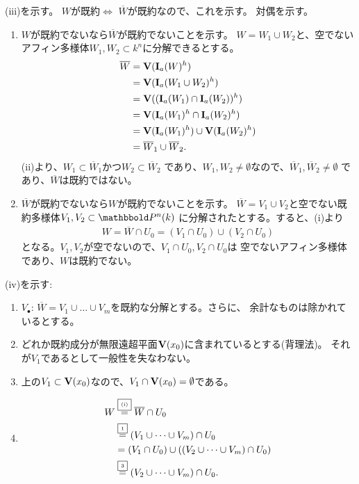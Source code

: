 \begin{myproof}
  (iii)を示す。
  $W$が既約$\iff $ $\overline W$が既約なので、これを示す。
  対偶を示す。
  \begin{enumerate}
    \item $W$が既約でないなら$\overline W$が既約でないことを示す。
    $W=W_1 \cup W_2$と、空でないアフィン多様体$W_1,W_2 \subset k^n$に分解できるとする。
    \begin{align}
      \overline W
      &=
      \textbf V(\textbf I_a(W)^h)\\
      &=
      \textbf V(\textbf I_a(W_1 \cup W_2)^h)\\
      &=
      \textbf V((\textbf I_a(W_1) \cap \textbf I_a(W_2))^h)\\
      &=
      \textbf V(\textbf I_a(W_1)^h \cap \textbf I_a(W_2)^h)\\
      &=
      \textbf V(\textbf I_a(W_1)^h) \cup \textbf V(\textbf I_a(W_2)^h)\\
      &=
      \overline W_1 \cup \overline W_2.
    \end{align}
    (ii)より、$W_1 \subset \overline W_1$かつ$W_2 \subset \overline W_2$
    であり、$W_1,W_2 \neq \emptyset$なので、$\overline W_1,\overline W_2 \neq \emptyset$
    であり、$\overline W$は既約ではない。
    \item
     $\overline W$が既約でないなら$W$が既約でないことを示す。
     $\overline W = V_1 \cup V_2$と空でない既約多様体$V_1,V_2 \subset \P^n(k)$
     に分解されたとする。すると、(i)より
     \begin{align}
       W = \overline W \cap U_0 = (V_1 \cap U_0) \cup (V_2 \cap U_0)
     \end{align}
     となる。$V_1,V_2$が空でないので、$V_1 \cap U_0,V_2 \cap U_0$は
     空でないアフィン多様体であり、$W$は既約でない。
  \end{enumerate}

  (iv)を示す:
  \begin{enumerate}
    \item $V_\bullet$: $\overline W = V_1 \cup \dots \cup V_m$を既約な分解とする。さらに、
    余計なものは除かれているとする。
    \item どれか既約成分が無限遠超平面$\textbf V(x_0)$に含まれているとする(背理法)。
    それが$V_1$であるとして一般性を失なわない。
    \item
    上の$V_1 \subset \textbf V(x_0)$なので、$V_1 \cap \textbf V(x_0) = \emptyset$である。
    \item
    \begin{align}
      W
      &\overset{\text{\fbox{\tiny (i)}}}{=}
      \overline W \cap U_0\\
      &\overset{\text{\fbox{\tiny 1}}}{=}
      (V_1\cup \dots \cup V_m)\cap U_0\\
      &=
      (V_1 \cap U_0)\cup ((V_2 \cup \dots \cup V_m)\cap U_0)\\
      &\overset{\text{\fbox{\tiny 3}}}{=}
      (V_2 \cup \dots \cup V_m)\cap U_0.
    \end{align}


\end{enumerate}
\end{myproof}
